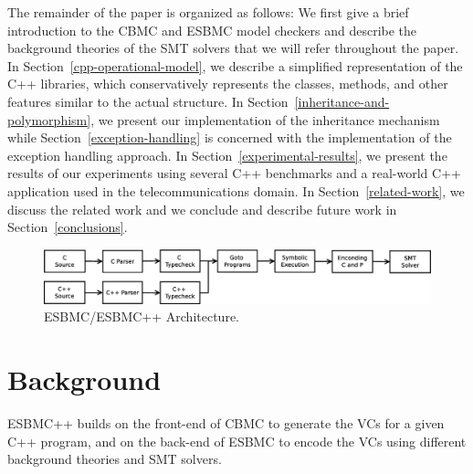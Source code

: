 \documentclass[conference]{IEEEtran}
\begin{document}
The remainder of the paper is organized as follows: We first give a brief
introduction to the CBMC and ESBMC model checkers and describe the background
theories of the SMT solvers that we will refer throughout the paper.
In Section~\ref{cpp-operational-model}, we describe a simplified representation of the C++
libraries, which conservatively represents the classes, methods, and other features
similar to the actual structure. In Section~\ref{inheritance-and-polymorphism}, we present
our implementation of the inheritance mechanism while Section~\ref{exception-handling}
is concerned with the implementation of the exception handling approach.
In Section~\ref{experimental-results}, we present the results of our experiments using
several C++ benchmarks and a real-world C++ application used in the telecommunications domain.
In Section~\ref{related-work}, we discuss the related work and we conclude and describe
future work in Section~\ref{conclusions}.

\begin{figure}[ht] \centering
\includegraphics[scale=0.35]{figures/esbmc-arch}
\caption{ESBMC/ESBMC++ Architecture.}
\label{figure:esbmc-arch}
\end{figure}

\section{Background}

ESBMC++ builds on the front-end of CBMC to generate the VCs for a given C++ program,
and on the back-end of ESBMC to encode the VCs using different background theories
and SMT solvers.
\end{document}
